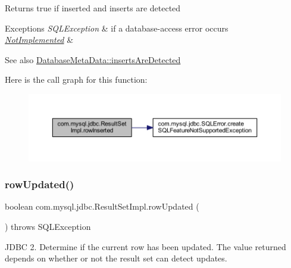 \begin{DoxyReturn}{Returns}
true if inserted and inserts are detected
\end{DoxyReturn}

\begin{DoxyExceptions}{Exceptions}
{\em S\+Q\+L\+Exception} & if a database-\/access error occurs \\
\hline
{\em \mbox{\hyperlink{classcom_1_1mysql_1_1jdbc_1_1_not_implemented}{Not\+Implemented}}} & \\
\hline
\end{DoxyExceptions}
\begin{DoxySeeAlso}{See also}
\mbox{\hyperlink{classcom_1_1mysql_1_1jdbc_1_1_database_meta_data_a06d1f2ed6eef1ddae5b42a8606644903}{Database\+Meta\+Data\+::inserts\+Are\+Detected}} 
\end{DoxySeeAlso}
Here is the call graph for this function\+:
\nopagebreak
\begin{figure}[H]
\begin{center}
\leavevmode
\includegraphics[width=350pt]{classcom_1_1mysql_1_1jdbc_1_1_result_set_impl_affa56f32911dd7a8e11cb24b17afc125_cgraph}
\end{center}
\end{figure}
\mbox{\label{classcom_1_1mysql_1_1jdbc_1_1_result_set_impl_a6a1bb16fac14ca4cb15ad07292a371ae}} 
\subsubsection{\texorpdfstring{row\+Updated()}{rowUpdated()}}
{\footnotesize\ttfamily boolean com.\+mysql.\+jdbc.\+Result\+Set\+Impl.\+row\+Updated (\begin{DoxyParamCaption}{ }\end{DoxyParamCaption}) throws S\+Q\+L\+Exception}

J\+D\+BC 2. Determine if the current row has been updated. The value returned depends on whether or not the result set can detect updates.


